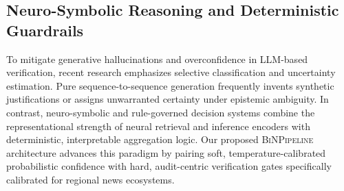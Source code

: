 \subsection{Neuro-Symbolic Reasoning and Deterministic Guardrails}
To mitigate generative hallucinations and overconfidence in LLM-based verification, recent research emphasizes selective classification and uncertainty estimation. Pure sequence-to-sequence generation frequently invents synthetic justifications or assigns unwarranted certainty under epistemic ambiguity. In contrast, neuro-symbolic and rule-governed decision systems combine the representational strength of neural retrieval and inference encoders with deterministic, interpretable aggregation logic. Our proposed \textsc{BiNPipeline} architecture advances this paradigm by pairing soft, temperature-calibrated probabilistic confidence with hard, audit-centric verification gates specifically calibrated for regional news ecosystems.
